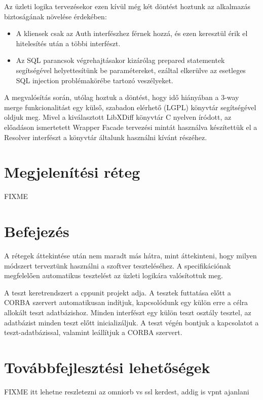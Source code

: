 \documentclass[a4paper,12pt]{article}
\begin{document}
Az üzleti logika tervezésekor ezen kívül még két döntést hoztunk az alkalmazás
biztoságának növelése érdekében:

\begin{itemize}
\item A kliensek csak az Auth interfészhez férnek hozzá, és ezen keresztül érik
el hitelesítés után a többi interfészt.
\item Az SQL parancsok végrehajtásakor kizárólag prepared statementek
segítségével helyettesítünk be paramétereket, ezáltal elkerülve az esetleges
SQL injection problémakörébe tartozó veszélyeket.
\end{itemize}

A megvalósítás során, utólag hoztuk a döntést, hogy idő hiányában a 3-way merge
funkcionalitást egy külső, szabadon elérhető (LGPL) könyvtár segítségével
oldjuk meg. Mivel a kiválasztott LibXDiff könyvtár C nyelven íródott, az
előadáson ismertetett Wrapper Facade tervezési mintát használva készítettük el
a Resolver interfészt a könyvtár általunk használni kívánt részéhez.

\section{Megjelenítési réteg}

FIXME

\section{Befejezés}

A rétegek áttekintése után nem maradt más hátra, mint áttekinteni, hogy milyen
módszert terveztünk használni a szoftver teszteléséhez. A specifikációnak
megfelelően automatikus tesztelést az üzleti logikára valósítottuk meg.

A teszt keretrendszert a cppunit projekt adja. A tesztek futtatása előtt a
CORBA szervert automatikusan indítjuk, kapcsolódunk egy külön erre a célra
allokált teszt adatbázishoz. Minden interfészt egy külön teszt osztály tesztel,
az adatbázist minden teszt előtt inicializáljuk. A teszt végén bontjuk a
kapcsolatot a teszt-adatbázissal, valamint leállítjuk a CORBA szervert.

\section{Továbbfejlesztési lehetőségek}

FIXME itt lehetne reszletezni az omniorb vs ssl kerdest, addig is vpnt ajanlani
\end{document}
